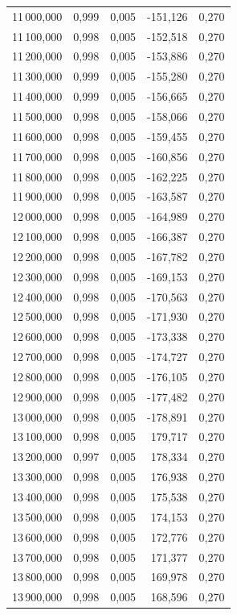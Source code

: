 \begin{longtable}{rrrrr}
11\,000,000 & 0,999 & 0,005 & -151,126 & 0,270\\
11\,100,000 & 0,998 & 0,005 & -152,518 & 0,270\\
11\,200,000 & 0,998 & 0,005 & -153,886 & 0,270\\
11\,300,000 & 0,999 & 0,005 & -155,280 & 0,270\\
11\,400,000 & 0,999 & 0,005 & -156,665 & 0,270\\
11\,500,000 & 0,998 & 0,005 & -158,066 & 0,270\\
11\,600,000 & 0,998 & 0,005 & -159,455 & 0,270\\
11\,700,000 & 0,998 & 0,005 & -160,856 & 0,270\\
11\,800,000 & 0,998 & 0,005 & -162,225 & 0,270\\
11\,900,000 & 0,998 & 0,005 & -163,587 & 0,270\\
12\,000,000 & 0,998 & 0,005 & -164,989 & 0,270\\
12\,100,000 & 0,998 & 0,005 & -166,387 & 0,270\\
12\,200,000 & 0,998 & 0,005 & -167,782 & 0,270\\
12\,300,000 & 0,998 & 0,005 & -169,153 & 0,270\\
12\,400,000 & 0,998 & 0,005 & -170,563 & 0,270\\
12\,500,000 & 0,998 & 0,005 & -171,930 & 0,270\\
12\,600,000 & 0,998 & 0,005 & -173,338 & 0,270\\
12\,700,000 & 0,998 & 0,005 & -174,727 & 0,270\\
12\,800,000 & 0,998 & 0,005 & -176,105 & 0,270\\
12\,900,000 & 0,998 & 0,005 & -177,482 & 0,270\\
13\,000,000 & 0,998 & 0,005 & -178,891 & 0,270\\
13\,100,000 & 0,998 & 0,005 & 179,717 & 0,270\\
13\,200,000 & 0,997 & 0,005 & 178,334 & 0,270\\
13\,300,000 & 0,998 & 0,005 & 176,938 & 0,270\\
13\,400,000 & 0,998 & 0,005 & 175,538 & 0,270\\
13\,500,000 & 0,998 & 0,005 & 174,153 & 0,270\\
13\,600,000 & 0,998 & 0,005 & 172,776 & 0,270\\
13\,700,000 & 0,998 & 0,005 & 171,377 & 0,270\\
13\,800,000 & 0,998 & 0,005 & 169,978 & 0,270\\
13\,900,000 & 0,998 & 0,005 & 168,596 & 0,270\\

\end{longtable}
